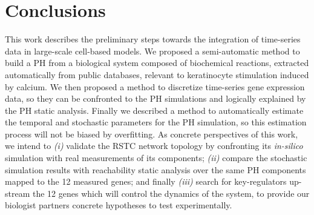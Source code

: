 \documentclass[11pt,a4paper,twoside]{epig}
\begin{document}
\section{Conclusions}
This work describes the preliminary steps towards the integration of time-series data in large-scale cell-based models. 
We proposed a semi-automatic method to build a PH from a biological system composed of biochemical reactions, extracted automatically from public databases, 
relevant to keratinocyte stimulation induced by calcium. 
We then proposed a method to discretize time-series gene expression data, so they can be confronted to the PH simulations and logically explained by the PH static analysis. 
Finally we described a method to automatically estimate the temporal and stochastic
parameters for the PH simulation, so this estimation process will not be biased by overfitting.
As concrete perspectives of this work, we intend to \emph{(i)} validate the RSTC network topology by confronting its \emph{in-silico} simulation with real measurements of its components;
\emph{(ii)} compare the stochastic simulation results with reachability static analysis over the same PH components mapped to the 12 measured genes; and 
finally \emph{(iii)} search for key-regulators up-stream the 12 genes which will control the dynamics of the system, to  provide our biologist 	 	  partners concrete 
hypotheses to test experimentally.


%
%
\end{document}
